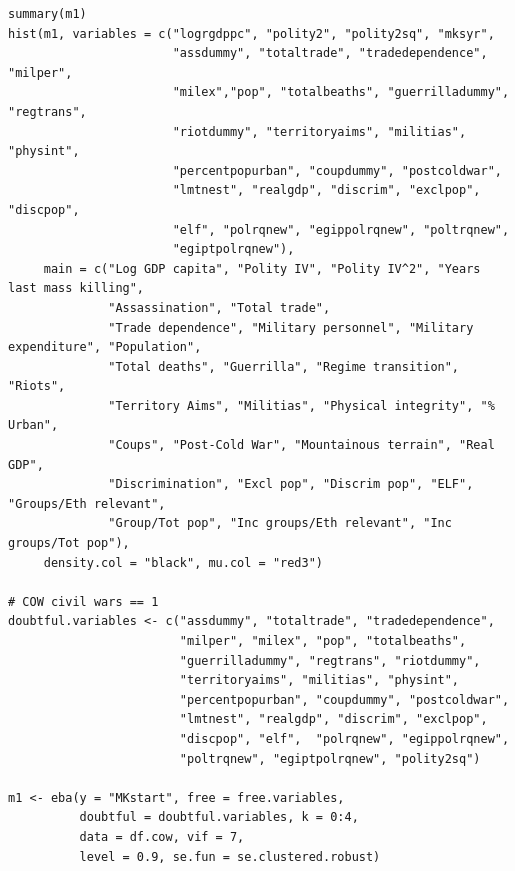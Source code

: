 \documentclass[a4paper,12pt]{article}
\begin{document}
\begin{verbatim}
summary(m1)
hist(m1, variables = c("logrgdppc", "polity2", "polity2sq", "mksyr",
                       "assdummy", "totaltrade", "tradedependence", "milper",
                       "milex","pop", "totalbeaths", "guerrilladummy", "regtrans",
                       "riotdummy", "territoryaims", "militias", "physint",
                       "percentpopurban", "coupdummy", "postcoldwar",
                       "lmtnest", "realgdp", "discrim", "exclpop", "discpop",
                       "elf", "polrqnew", "egippolrqnew", "poltrqnew",
                       "egiptpolrqnew"),
     main = c("Log GDP capita", "Polity IV", "Polity IV^2", "Years last mass killing",
              "Assassination", "Total trade", 
              "Trade dependence", "Military personnel", "Military expenditure", "Population", 
              "Total deaths", "Guerrilla", "Regime transition", "Riots",
              "Territory Aims", "Militias", "Physical integrity", "% Urban",
              "Coups", "Post-Cold War", "Mountainous terrain", "Real GDP",
              "Discrimination", "Excl pop", "Discrim pop", "ELF", "Groups/Eth relevant", 
              "Group/Tot pop", "Inc groups/Eth relevant", "Inc groups/Tot pop"),
     density.col = "black", mu.col = "red3")
     
# COW civil wars == 1
doubtful.variables <- c("assdummy", "totaltrade", "tradedependence",
                        "milper", "milex", "pop", "totalbeaths",
                        "guerrilladummy", "regtrans", "riotdummy",
                        "territoryaims", "militias", "physint",
                        "percentpopurban", "coupdummy", "postcoldwar",
                        "lmtnest", "realgdp", "discrim", "exclpop",
                        "discpop", "elf",  "polrqnew", "egippolrqnew",
                        "poltrqnew", "egiptpolrqnew", "polity2sq")

m1 <- eba(y = "MKstart", free = free.variables,
          doubtful = doubtful.variables, k = 0:4,
          data = df.cow, vif = 7,
          level = 0.9, se.fun = se.clustered.robust)
          

\end{verbatim}
\end{document}
